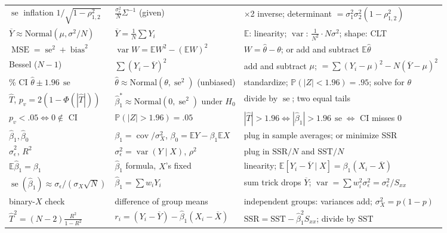 \documentclass[11pt]{article}
\newcommand{\E}{\mathbb{E}}
\newcommand{\Var}{\operatorname{var}}
\newcommand{\Cov}{\operatorname{cov}}
\newcommand{\se}{\operatorname{se}}
\newcommand{\MSE}{\operatorname{MSE}}
\newcommand{\bias}{\operatorname{bias}}
\renewcommand{\P}{\mathbb{P}}
\newcommand{\given}{\mid}
\newcommand{\Norm}{\text{Normal}}
\newcommand{\SSR}{\mathrm{SSR}}
\newcommand{\SST}{\mathrm{SST}}
\newcommand{\Ybar}{\overline{Y}}
\newcommand{\Xbar}{\overline{X}}
\begin{document}
{\begin{longtable}{@{}>{\raggedright\arraybackslash}p{4.6cm}>{\raggedright\arraybackslash}p{4.4cm}>{\raggedright\arraybackslash}p{6.6cm}@{}}
$\se$ inflation $1/\sqrt{1-\rho_{1,2}^2}$ & $\frac{\sigma_\epsilon^2}{N}\Sigma^{-1}$ (given) & 2$\times$2 inverse; determinant $=\sigma_1^2\sigma_2^2(1-\rho_{1,2}^2)$\\
$\Ybar\approx\Norm(\mu,\sigma^2/N)$ & $\Ybar=\frac1N\sum Y_i$ & $\E$: linearity; $\Var$: $\frac1{N^2}\cdot N\sigma^2$; shape: CLT\\
$\MSE=\se^2+\bias^2$ & $\Var W=\E W^2-(\E W)^2$ & $W=\hat\theta-\theta$; or add and subtract $\E\hat\theta$\\
Bessel ($N-1$) & $\sum(Y_i-\Ybar)^2$ & add and subtract $\mu$; $=\sum(Y_i-\mu)^2-N(\Ybar-\mu)^2$\\
95\% CI $\hat\theta\pm1.96\,\se$ & $\hat\theta\approx\Norm(\theta,\se^2)$ (unbiased) & standardize; $\P(|Z|<1.96)=.95$; solve for $\theta$\\
$\hat T$, $p_v=2(1-\Phi(|\hat T|))$ & $\hat\beta_1^*\approx\Norm(0,\se^2)$ under $H_0$ & divide by $\se$; two equal tails\\
$p_v<.05\iff0\notin$ CI & $\P(|Z|>1.96)=.05$ & $|\hat T|>1.96\iff|\hat\beta_1|>1.96\,\se\iff$ CI misses 0\\
$\hat\beta_1,\hat\beta_0$ & $\beta_1=\Cov/\sigma_X^2$, $\beta_0=\E Y-\beta_1\E X$ & plug in sample averages; or minimize SSR\\
$\hat\sigma_\epsilon^2$, $R^2$ & $\sigma_\epsilon^2=\Var(Y\given X)$, $\rho^2$ & plug in $\SSR/N$ and $\SST/N$\\
$\E\hat\beta_1=\beta_1$ & $\hat\beta_1$ formula, $X$'s fixed & linearity; $\E[Y_i-\Ybar\given X]=\beta_1(X_i-\Xbar)$\\
$\se(\hat\beta_1)\approx\sigma_\epsilon/(\sigma_X\sqrt N)$ & $\hat\beta_1=\sum w_iY_i$ & sum trick drops $\Ybar$; $\Var=\sum w_i^2\sigma_\epsilon^2=\sigma_\epsilon^2/S_{xx}$\\
binary-$X$ check & difference of group means & independent groups: variances add; $\sigma_X^2=p(1-p)$\\
$\hat T^2=(N-2)\frac{R^2}{1-R^2}$ & $r_i=(Y_i-\Ybar)-\hat\beta_1(X_i-\Xbar)$ & $\SSR=\SST-\hat\beta_1^2S_{xx}$; divide by $\SST$\\
\bottomrule
\end{longtable}
}
\end{document}
